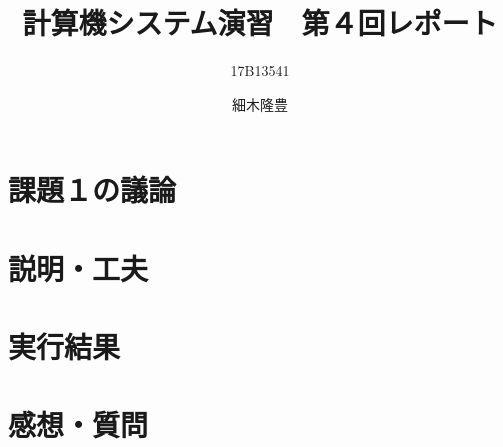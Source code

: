 \documentclass{jarticle}
\title{計算機システム演習　第４回レポート}
\author{17B13541 \and 細木隆豊}
\date{}
\begin{document}
\maketitle
  \section{課題１の議論}
  \section{説明・工夫}
  \section{実行結果}
  \section{感想・質問}
\end{document}
